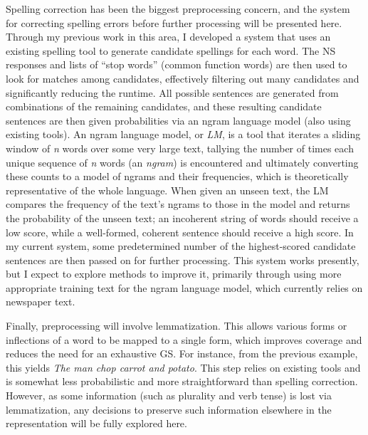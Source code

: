 \par
Spelling correction has been the biggest preprocessing concern, and the system for correcting spelling errors before further processing will be presented here. Through my previous work in this area, I developed a system that uses an existing spelling tool to generate candidate spellings for each word. The NS responses and lists of ``stop words'' (common function words) are then used to look for matches among candidates, effectively filtering out many candidates and significantly reducing the runtime. All possible sentences are generated from combinations of the remaining candidates, and these resulting candidate sentences are then given probabilities via an ngram language model (also using existing tools). An ngram language model, or \textit{LM}, is a tool that iterates a sliding window of \textit{n} words over some very large text, tallying the number of times each unique sequence of \textit{n} words (an \textit{ngram}) is encountered and ultimately converting these counts to a model of ngrams and their frequencies, which is theoretically representative of the whole language. When given an unseen text, the LM compares the frequency of the text's ngrams to those in the model and returns the probability of the unseen text; an incoherent string of words should receive a low score, while a well-formed, coherent sentence should receive a high score. In my current system, some predetermined number of the highest-scored candidate sentences are then passed on for further processing. This system works presently, but I expect to explore methods to improve it, primarily through using more appropriate training text for the ngram language model, which currently relies on newspaper text.
\par
Finally, preprocessing will involve lemmatization. This allows various forms or inflections of a word to be mapped to a single form, which improves coverage and reduces the need for an exhaustive GS. For instance, from the previous example, this yields \textit{The man chop carrot and potato}. This step relies on existing tools and is somewhat less probabilistic and more straightforward than spelling correction. However, as some information (such as plurality and verb tense) is lost via lemmatization, any decisions to preserve such information elsewhere in the representation will be fully explored here.
\par
